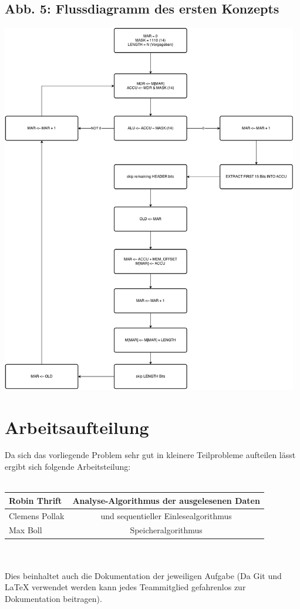 \documentclass[12pt,titlepage]{article}
\begin{document}
\subsection{Abb. 5: Flussdiagramm des ersten Konzepts}
\includegraphics[width=13cm]{algo_flow.png}

\newpage

\section{Arbeitsaufteilung}
Da sich das vorliegende Problem sehr gut in kleinere Teilprobleme aufteilen lässt ergibt sich folgende 
Arbeitsteilung:
\leavevmode \\
\\
\begin{tabular}{|l|c|}
\hline
Robin Thrift &  Analyse-Algorithmus der ausgelesenen Daten \\
\hline
Clemens Pollak & und sequentieller Einlesealgorithmus \\
\hline
Max Boll & Speicheralgorithmus \\
\hline
\end{tabular}
\leavevmode \\
\\
Dies beinhaltet auch die Dokumentation der jeweiligen Aufgabe (Da Git und LaTeX verwendet werden kann jedes 
Teammitglied gefahrenlos zur Dokumentation beitragen).
\end{document}
